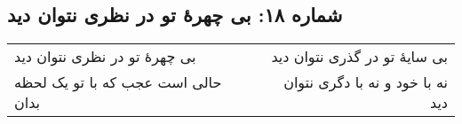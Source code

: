 \begin{center}
\section*{شماره ۱۸: بی چهرۀ تو در نظری نتوان دید}
\label{sec:018}
\begin{longtable}{l p{0.5cm} r}
بی چهرهٔ تو در نظری نتوان دید
&&
بی سایهٔ تو در گذری نتوان دید
\\
حالی است عجب که با تو یک لحظه بدان
&&
نه با خود و نه با دگری نتوان دید
\\
\end{longtable}
\end{center}
